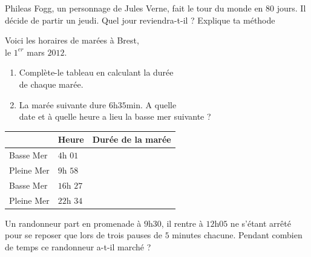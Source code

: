 \documentclass[a4paper,10pt]{report}
\begin{document}
\begin{ex}
Phileas Fogg, un personnage de Jules Verne, fait le tour du monde en $80$ jours. Il décide de partir un jeudi. Quel jour reviendra-t-il ? Explique ta méthode
\end{ex}

\begin{ex}
Voici les horaires de marées à Brest, \\le $1^{er}$ mars $2012$.

\begin{enumerate}
\item Complète-le tableau en calculant la durée \\de chaque marée.
\item La marée suivante dure $6$h$35$min. A quelle \\date et à quelle heure a lieu la basse mer suivante ?
\end{enumerate}

\vspace{-4cm}
\begin{flushright}
\renewcommand{\arraystretch}{1.7}
\begin{tabular}{|m{2cm}|m{1.5cm}|m{3cm}|}
\hline
 & Heure & Durée de la marée \\\hline
Basse Mer & $4$h $01$ &	\\\hline
Pleine Mer & $9$h $58$ & \\\hline
Basse Mer & $16$h $27$ & \\\hline
Pleine Mer & $22$h $34$ & \\\hline
\end{tabular}
\end{flushright}
\end{ex}

\begin{ex}
Un randonneur part en promenade à $9$h$30$, il rentre à $12$h$05$ ne s'étant arrêté pour se reposer que lors de trois pauses de $5$ minutes chacune. Pendant combien de temps ce randonneur a-t-il marché ?
\end{ex}
\end{document}
